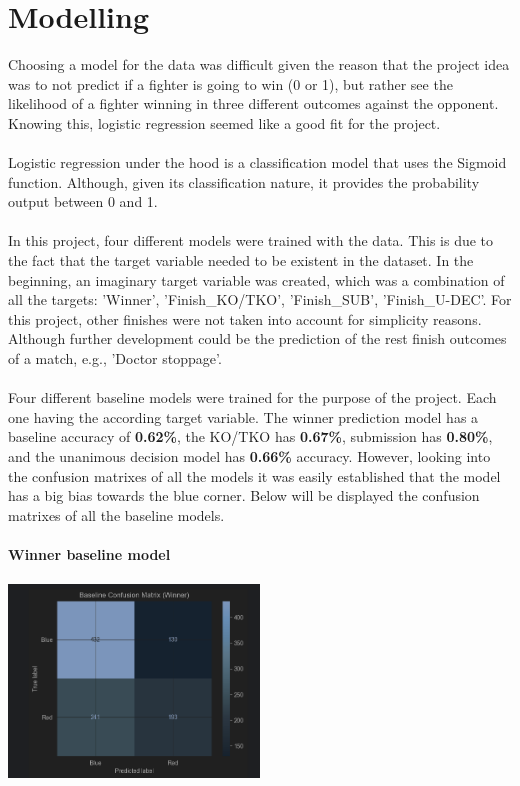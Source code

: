 \documentclass{article}
\begin{document}
\section{Modelling}
Choosing a model for the data was difficult given the reason that the project idea was to not predict if a fighter is going to win (0 or 1), but rather see the likelihood of a fighter winning in three different outcomes against the opponent. Knowing this, logistic regression seemed like a good fit for the project.\\\\
Logistic regression under the hood is a classification model that uses the Sigmoid function. Although, given its classification nature, it provides the probability output between 0 and 1.\\\\
In this project, four different models were trained with the data. This is due to the fact that the target variable needed to be existent in the dataset. In the beginning, an imaginary target variable was created, which was a combination of all the targets: 'Winner', 'Finish\_KO/TKO', 'Finish\_SUB', 'Finish\_U-DEC'. For this project, other finishes were not taken into account for simplicity reasons. Although further development could be the prediction of the rest finish outcomes of a match, e.g., 'Doctor stoppage'.\\\\
Four different baseline models were trained for the purpose of the project. Each one having the according target variable. The winner prediction model has a baseline accuracy of \textbf{0.62\%}, the KO/TKO has \textbf{0.67\%}, submission has \textbf{0.80\%}, and the unanimous decision model has \textbf{0.66\%} accuracy. However, looking into the confusion matrixes of all the models it was easily established that the model has a big bias towards the blue corner.
Below will be displayed the confusion matrixes of all the baseline models.\\\\
\newpage
	{\large \textbf{Winner baseline model}}\\\\
	\includegraphics[width=0.5\textwidth]{images/CM_Winner.png}\\\\
	
\end{document}
